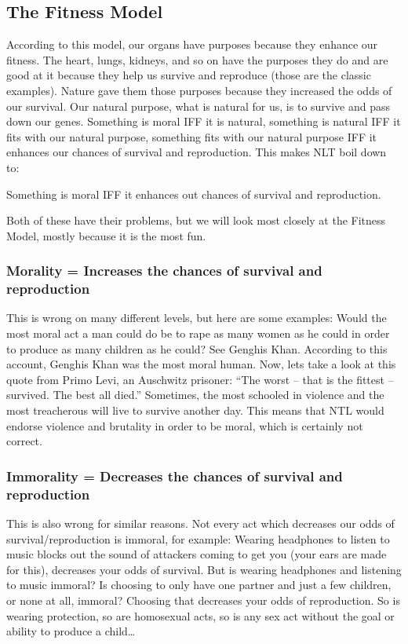 \subsection{The Fitness Model}

According to this model, our organs have purposes because they enhance our fitness. The heart, lungs, kidneys, and so on have the purposes they do and are good at it because they help us survive and reproduce (those are the classic examples). Nature gave them those purposes because they increased the odds of our survival. Our natural purpose, what is natural for us, is to survive and pass down our genes. Something is moral IFF it is natural, something is natural IFF it fits with our natural purpose, something fits with our natural purpose IFF it enhances our chances of survival and reproduction. This makes NLT boil down to:

\begin{center}
Something is moral IFF it enhances out chances of survival and reproduction.
\end{center}

Both of these have their problems, but we will look most closely at the Fitness Model, mostly because it is the most fun.

\subsubsection{Morality = Increases the chances of survival and reproduction}

This is wrong on many different levels, but here are some examples: Would the most moral act a man could do be to rape as many women as he could in order to produce as many children as he could? See Genghis Khan. According to this account, Genghis Khan was the most moral human. Now, lets take a look at this quote from Primo Levi, an Auschwitz prisoner: “The worst – that is the fittest – survived. The best all died.” Sometimes, the most schooled in violence and the most treacherous will live to survive another day. This means that NTL would endorse violence and brutality in order to be moral, which is certainly not correct.

\subsubsection{Immorality = Decreases the chances of survival and reproduction}

This is also wrong for similar reasons. Not every act which decreases our odds of survival/reproduction is immoral, for example: Wearing headphones to listen to music blocks out the sound of attackers coming to get you (your ears are made for this), decreases your odds of survival. But is wearing headphones and listening to music immoral? Is choosing to only have one partner and just a few children, or none at all, immoral? Choosing that decreases your odds of reproduction. So is wearing protection, so are homosexual acts, so is any sex act without the goal or ability to produce a child… 